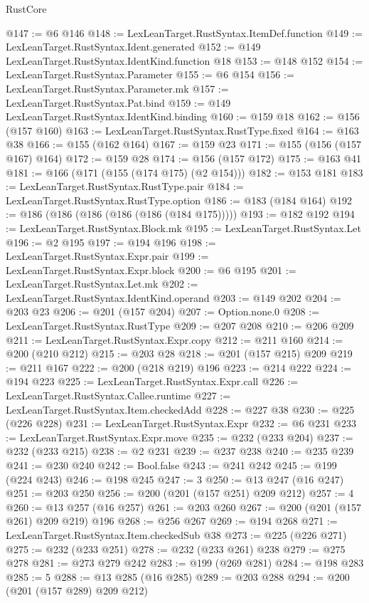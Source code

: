 \begin{lexlean}{RustCore}
\begin{coremodule}
@147 := @6 @146
@148 := LexLeanTarget.RustSyntax.ItemDef.function
@149 := LexLeanTarget.RustSyntax.Ident.generated
@152 := @149 LexLeanTarget.RustSyntax.IdentKind.function @18
@153 := @148 @152
@154 := LexLeanTarget.RustSyntax.Parameter
@155 := @6 @154
@156 := LexLeanTarget.RustSyntax.Parameter.mk
@157 := LexLeanTarget.RustSyntax.Pat.bind
@159 := @149 LexLeanTarget.RustSyntax.IdentKind.binding
@160 := @159 @18
@162 := @156 (@157 @160)
@163 := LexLeanTarget.RustSyntax.RustType.fixed
@164 := @163 @38
@166 := @155 (@162 @164)
@167 := @159 @23
@171 := @155 (@156 (@157 @167) @164)
@172 := @159 @28
@174 := @156 (@157 @172)
@175 := @163 @41
@181 := @166 (@171 (@155 (@174 @175) (@2 @154)))
@182 := @153 @181
@183 := LexLeanTarget.RustSyntax.RustType.pair
@184 := LexLeanTarget.RustSyntax.RustType.option
@186 := @183 (@184 @164)
@192 := @186 (@186 (@186 (@186 (@186 (@184 @175)))))
@193 := @182 @192
@194 := LexLeanTarget.RustSyntax.Block.mk
@195 := LexLeanTarget.RustSyntax.Let
@196 := @2 @195
@197 := @194 @196
@198 := LexLeanTarget.RustSyntax.Expr.pair
@199 := LexLeanTarget.RustSyntax.Expr.block
@200 := @6 @195
@201 := LexLeanTarget.RustSyntax.Let.mk
@202 := LexLeanTarget.RustSyntax.IdentKind.operand
@203 := @149 @202
@204 := @203 @23
@206 := @201 (@157 @204)
@207 := Option.none.{0}
@208 := LexLeanTarget.RustSyntax.RustType
@209 := @207 @208
@210 := @206 @209
@211 := LexLeanTarget.RustSyntax.Expr.copy
@212 := @211 @160
@214 := @200 (@210 @212)
@215 := @203 @28
@218 := @201 (@157 @215) @209
@219 := @211 @167
@222 := @200 (@218 @219) @196
@223 := @214 @222
@224 := @194 @223
@225 := LexLeanTarget.RustSyntax.Expr.call
@226 := LexLeanTarget.RustSyntax.Callee.runtime
@227 := LexLeanTarget.RustSyntax.Item.checkedAdd
@228 := @227 @38
@230 := @225 (@226 @228)
@231 := LexLeanTarget.RustSyntax.Expr
@232 := @6 @231
@233 := LexLeanTarget.RustSyntax.Expr.move
@235 := @232 (@233 @204)
@237 := @232 (@233 @215)
@238 := @2 @231
@239 := @237 @238
@240 := @235 @239
@241 := @230 @240
@242 := Bool.false
@243 := @241 @242
@245 := @199 (@224 @243)
@246 := @198 @245
@247 := 3
@250 := @13 @247 (@16 @247)
@251 := @203 @250
@256 := @200 (@201 (@157 @251) @209 @212)
@257 := 4
@260 := @13 @257 (@16 @257)
@261 := @203 @260
@267 := @200 (@201 (@157 @261) @209 @219) @196
@268 := @256 @267
@269 := @194 @268
@271 := LexLeanTarget.RustSyntax.Item.checkedSub @38
@273 := @225 (@226 @271)
@275 := @232 (@233 @251)
@278 := @232 (@233 @261) @238
@279 := @275 @278
@281 := @273 @279 @242
@283 := @199 (@269 @281)
@284 := @198 @283
@285 := 5
@288 := @13 @285 (@16 @285)
@289 := @203 @288
@294 := @200 (@201 (@157 @289) @209 @212)

\end{coremodule}
\end{lexlean}
